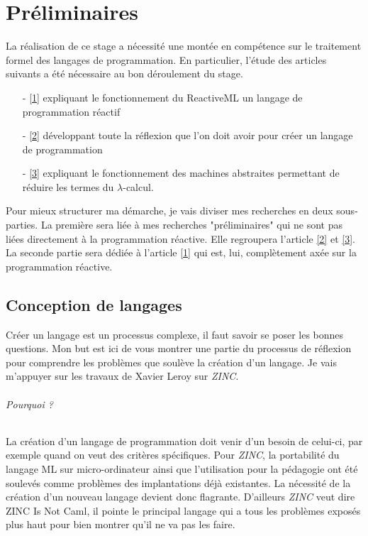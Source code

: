 \documentclass[10pt,a4paper]{report}
\begin{document}
	
	
	
	\chapter{Préliminaires}
La réalisation de ce stage a nécessité une montée en compétence sur le traitement formel des langages de programmation. En particulier, l'étude des articles
suivants a été nécessaire au bon déroulement du stage.
\begin{enumerate}
	\item[-] \hyperref[ReactiveML]{[1]} expliquant le fonctionnement du ReactiveML un langage de programmation réactif
	\item[-] \hyperref[ZINC]{[2]} développant toute la réflexion que l'on doit avoir pour créer un langage de programmation
	\item[-] \hyperref[Calculi]{[3]} expliquant le fonctionnement des machines abstraites permettant de réduire les termes du $\lambda $-calcul.
\end{enumerate}
Pour mieux structurer ma démarche, je vais diviser mes recherches en deux sous-parties. La première sera liée à mes recherches "préliminaires" qui ne sont pas liées directement à la programmation réactive. Elle regroupera l'article \hyperref[ZINC]{[2]} et \hyperref[Calculi]{[3]}. La seconde partie sera dédiée à l'article \hyperref[ReactiveML]{[1]} qui est, lui, complètement axée sur la programmation réactive. 
\newpage



	\section{Conception de langages}
	
Créer un langage est un processus complexe, il faut savoir se poser les bonnes questions. Mon but est ici de vous
montrer une partie du processus de réflexion pour comprendre les problèmes que soulève la création d'un langage.
Je vais m'appuyer sur les travaux de Xavier Leroy sur \textit{ZINC}.
\medbreak

\subparagraph{Pourquoi ?} 
La création d'un langage de programmation doit venir d'un besoin de celui-ci, par exemple quand on veut des critères spécifiques.
Pour \textit{ZINC}, la portabilité du langage ML sur micro-ordinateur ainsi que l'utilisation pour la pédagogie ont été soulevés
comme problèmes des implantations déjà existantes. La nécessité de la création d'un nouveau langage devient donc flagrante.
D'ailleurs \textit{ZINC} veut dire ZINC Is Not Caml, il pointe le principal langage qui a tous les problèmes exposés plus haut
pour bien montrer qu'il ne va pas les faire. 
\end{document}

